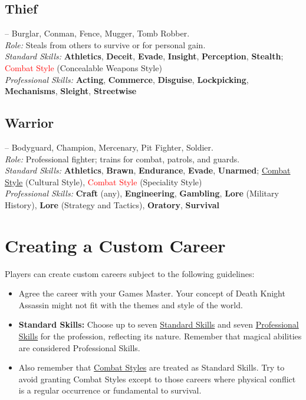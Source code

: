 \documentclass[10pt]{article}
\newcommand{\skill}[1]{\textbf{#1}}
\begin{document}
\vspace{0.2cm}
\subsection*{Thief}
\label{career:thief}
 -- Burglar, Conman, Fence, Mugger, Tomb Robber.\\
\textit{Role:} Steals from others to survive or for personal gain.\\
\textit{Standard Skills:} \skill{Athletics}, \skill{Deceit}, \skill{Evade}, \skill{Insight}, \skill{Perception}, \skill{Stealth}; \textcolor{red}{Combat Style} (Concealable Weapons Style)\\
\textit{Professional Skills:} \skill{Acting}, \skill{Commerce}, \skill{Disguise}, \skill{Lockpicking}, \skill{Mechanisms}, \skill{Sleight}, \skill{Streetwise}

\vspace{0.2cm}
\subsection*{Warrior}
\label{career:warrior}
 -- Bodyguard, Champion, Mercenary, Pit Fighter, Soldier.\\
\textit{Role:} Professional fighter; trains for combat, patrols, and guards.\\
\textit{Standard Skills:} \skill{Athletics}, \skill{Brawn}, \skill{Endurance}, \skill{Evade}, \skill{Unarmed}; \hyperref[sec:combat-styles]{Combat Style} (Cultural Style), \textcolor{red}{Combat Style} (Speciality Style)\\
\textit{Professional Skills:} \skill{Craft} (any), \skill{Engineering}, \skill{Gambling}, \skill{Lore} (Military History), \skill{Lore} (Strategy and Tactics), \skill{Oratory}, \skill{Survival}

\newpage
\section{Creating a Custom Career}
\label{sec:custom-career}

Players can create custom careers subject to the following guidelines:
\begin{itemize}
    \item Agree the career with your Games Master. Your concept of Death Knight Assassin might not fit with the themes and style of the world.
    \item \textbf{Standard Skills:} Choose up to seven \hyperref[sec:skill_table]{Standard Skills} and seven \hyperref[sec:skill_table]{Professional Skills} for the profession, reflecting its nature. Remember that magical abilities are considered Professional Skills.
    \item Also remember that \hyperref[sec:combat-styles]{Combat Styles} are treated as Standard Skills. Try to avoid granting Combat Styles except to those careers where physical conflict is a regular occurrence or fundamental to survival.
\end{itemize}
\end{document}
